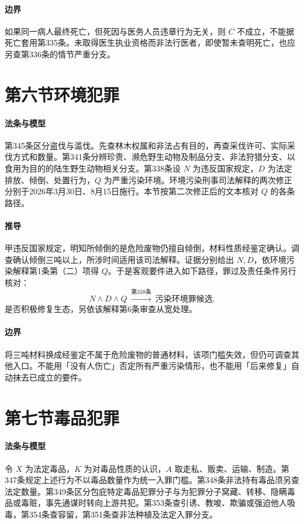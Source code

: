 \paragraph{边界}
如果同一病人最终死亡，但死因与医务人员违章行为无关，则 \(C\) 不成立，不能据死亡套用第335条。未取得医生执业资格而非法行医者，即使暂未查明死亡，也应另查第336条的情节严重分支。

\section{第六节\quad 环境犯罪}

\paragraph{法条与模型}
第345条区分盗伐与滥伐。先查林木权属和非法占有目的，再查采伐许可、实际采伐方式和数量。第341条分辨珍贵、濒危野生动物及制品分支、非法狩猎分支、以食用为目的的陆生野生动物相关分支。第338条设 \(N\) 为违反国家规定，\(D\) 为法定排放、倾倒、处置行为，\(Q\) 为严重污染环境。环境污染刑事司法解释的两次修正分别于2026年3月30日、8月15日施行。本节按第二次修正后的文本核对 \(Q\) 的各条路径。

\paragraph{推导}
甲违反国家规定，明知所倾倒的是危险废物仍擅自倾倒，材料性质经鉴定确认。调查确认倾倒三吨以上，所涉时间适用该司法解释。证据分别给出 \(N,D\)，依环境污染解释第1条第（二）项得 \(Q\)。于是客观要件进入如下路径，罪过及责任条件另行核对：
\[
N\land D\land Q\ \xrightarrow{\text{第338条}}\ \text{污染环境罪候选}.
\]
是否积极修复生态，另依该解释第6条审查从宽处理。

\paragraph{边界}
将三吨材料换成经鉴定不属于危险废物的普通材料，该项门槛失效，但仍可调查其他入口。不能用「没有人伤亡」否定所有严重污染情形，也不能用「后来修复」自动抹去已成立的要件。

\section{第七节\quad 毒品犯罪}

\paragraph{法条与模型}
令 \(X\) 为法定毒品，\(K\) 为对毒品性质的认识，\(A\) 取走私、贩卖、运输、制造。第347条规定上述行为不以毒品数量作为统一入罪门槛。第348条非法持有毒品须另查法定数量。第349条区分包庇特定毒品犯罪分子与为犯罪分子窝藏、转移、隐瞒毒品或毒赃，事先通谋时转向上游共犯。第353条查引诱、教唆、欺骗或强迫他人吸毒，第354条查容留，第351条查非法种植及法定入罪分支。

